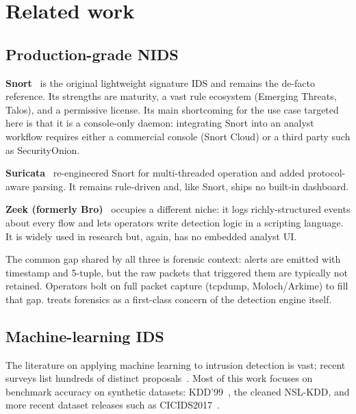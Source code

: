 \section{Related work}
\label{sec:related_work}

\subsection{Production-grade NIDS}

\textbf{Snort}~\cite{roesch1999snort} is the original lightweight
signature IDS and remains the de-facto reference. Its strengths are
maturity, a vast rule ecosystem (Emerging Threats, Talos), and a
permissive license. Its main shortcoming for the use case targeted here
is that it is a console-only daemon: integrating Snort into an analyst
workflow requires either a commercial console (Snort Cloud) or a third
party such as SecurityOnion.

\textbf{Suricata}~\cite{suricata} re-engineered Snort for multi-threaded
operation and added protocol-aware parsing. It remains rule-driven and,
like Snort, ships no built-in dashboard.

\textbf{Zeek (formerly Bro)}~\cite{paxson1999bro} occupies a different
niche: it logs richly-structured events about every flow and lets
operators write detection logic in a scripting language. It is widely
used in research but, again, has no embedded analyst UI.

The common gap shared by all three is forensic context: alerts are
emitted with timestamp and 5-tuple, but the raw packets that triggered
them are typically not retained. Operators bolt on full packet capture
(tcpdump, Moloch/Arkime) to fill that gap. \nidsname{} treats forensics
as a first-class concern of the detection engine itself.

\subsection{Machine-learning IDS}

The literature on applying machine learning to intrusion detection is
vast; recent surveys list hundreds of distinct
proposals~\cite{buczak2016survey,khraisat2019survey}. Most of this work
focuses on benchmark accuracy on synthetic datasets:
KDD'99~\cite{tavallaee2009detailed}, the cleaned NSL-KDD, and more
recent dataset releases such as CICIDS2017~\cite{sharafaldin2018cicids}.

